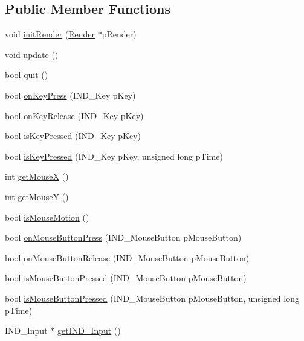 \subsection*{Public Member Functions}
\begin{DoxyCompactItemize}
\item 
void \hyperlink{class_symp_1_1_input_manager_a4b0de18e7d9db24f0f23206ab6868c78}{init\-Render} (\hyperlink{class_symp_1_1_render}{Render} $\ast$p\-Render)
\item 
void \hyperlink{class_symp_1_1_input_manager_a17e5bde3349c5acfdcaed337606f2006}{update} ()
\item 
bool \hyperlink{class_symp_1_1_input_manager_a686f69d4eeba6aa7b1072da8ac542e97}{quit} ()
\item 
bool \hyperlink{class_symp_1_1_input_manager_ab64961cda313a90023bb69fe238290ec}{on\-Key\-Press} (I\-N\-D\-\_\-\-Key p\-Key)
\item 
bool \hyperlink{class_symp_1_1_input_manager_a9766fbfc17a36de3f66232a712903c4e}{on\-Key\-Release} (I\-N\-D\-\_\-\-Key p\-Key)
\item 
bool \hyperlink{class_symp_1_1_input_manager_a0c7312f32732c5a4bf678ec3fdbf8ec0}{is\-Key\-Pressed} (I\-N\-D\-\_\-\-Key p\-Key)
\item 
bool \hyperlink{class_symp_1_1_input_manager_a46c0e5311522ed10818726f4b553a273}{is\-Key\-Pressed} (I\-N\-D\-\_\-\-Key p\-Key, unsigned long p\-Time)
\item 
int \hyperlink{class_symp_1_1_input_manager_a98a0e230497375792f0f3f0e4193b877}{get\-Mouse\-X} ()
\item 
int \hyperlink{class_symp_1_1_input_manager_a74d8c0805e2c35342bae7372cfa25eb9}{get\-Mouse\-Y} ()
\item 
bool \hyperlink{class_symp_1_1_input_manager_a1d165f8b05abd4917b80057b8dcc1b57}{is\-Mouse\-Motion} ()
\item 
bool \hyperlink{class_symp_1_1_input_manager_a59ae59e4026ec437e30ac1338a1b4d57}{on\-Mouse\-Button\-Press} (I\-N\-D\-\_\-\-Mouse\-Button p\-Mouse\-Button)
\item 
bool \hyperlink{class_symp_1_1_input_manager_a16fb8eea2121bc783bf4802ce6331452}{on\-Mouse\-Button\-Release} (I\-N\-D\-\_\-\-Mouse\-Button p\-Mouse\-Button)
\item 
bool \hyperlink{class_symp_1_1_input_manager_a328f07308b781f78c937354f0e85fe89}{is\-Mouse\-Button\-Pressed} (I\-N\-D\-\_\-\-Mouse\-Button p\-Mouse\-Button)
\item 
bool \hyperlink{class_symp_1_1_input_manager_a364ae17c2627897c66f51e29fca289b2}{is\-Mouse\-Button\-Pressed} (I\-N\-D\-\_\-\-Mouse\-Button p\-Mouse\-Button, unsigned long p\-Time)
\item 
I\-N\-D\-\_\-\-Input $\ast$ \hyperlink{class_symp_1_1_input_manager_a1c42a4ed489d11686b164d81dc25eb9e}{get\-I\-N\-D\-\_\-\-Input} ()
\end{DoxyCompactItemize}
